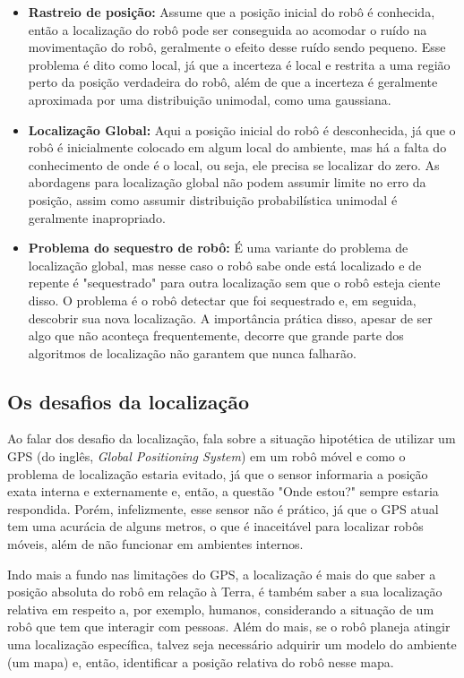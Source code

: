 \documentclass[acronym, symbols]{fei}
\begin{document}
			\begin{itemize}
				\item \textbf{Rastreio de posição:} Assume que a posição inicial do robô é conhecida, então a localização do robô pode ser conseguida ao acomodar o ruído na movimentação do robô, geralmente o efeito desse ruído sendo pequeno. Esse problema é dito como local, já que a incerteza é local e restrita a uma região perto da posição verdadeira do robô, além de que a incerteza é geralmente aproximada por uma distribuição unimodal, como uma gaussiana.
				
				\item \textbf{Localização Global:} Aqui a posição inicial do robô é desconhecida, já que o robô é inicialmente colocado em algum local do ambiente, mas há a falta do conhecimento de onde é o local, ou seja, ele precisa se localizar do zero. As abordagens para localização global não podem assumir limite no erro da posição, assim como assumir distribuição probabilística unimodal é geralmente inapropriado.
				
				\item \textbf{Problema do sequestro de robô:} É uma variante do problema de localização global, mas nesse caso o robô sabe onde está localizado e de repente é "sequestrado" para outra localização sem que o robô esteja ciente disso. O problema é o robô detectar que foi sequestrado e, em seguida, descobrir sua nova localização. A importância prática disso, apesar de ser algo que não aconteça frequentemente, decorre que grande parte dos algoritmos de localização não garantem que nunca falharão.
			\end{itemize}
			
		\subsection{Os desafios da localização}
		
			Ao falar dos desafio da localização, \textcite{siegwart2011introduction} fala sobre a situação hipotética de utilizar um GPS (do inglês, \textit{Global Positioning System}) em um robô móvel e como o problema de localização estaria evitado, já que o sensor informaria a posição exata interna e externamente e, então, a questão "Onde estou?" sempre estaria respondida. Porém, infelizmente, esse sensor não é prático, já que o GPS atual tem uma acurácia de alguns metros, o que é inaceitável para localizar robôs móveis, além de não funcionar em ambientes internos. 
			
			Indo mais a fundo nas limitações do GPS, a localização é mais do que saber a posição absoluta do robô em relação à Terra, é também saber a sua localização relativa em respeito a, por exemplo, humanos, considerando a situação de um robô que tem que interagir com pessoas. Além do mais, se o robô planeja atingir uma localização específica, talvez seja necessário adquirir um modelo do ambiente (um mapa) e, então, identificar a posição relativa do robô nesse mapa. 
			
\end{document}
